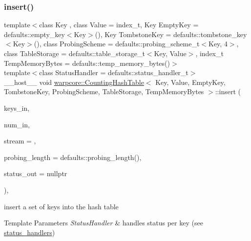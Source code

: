 \subsubsection{\texorpdfstring{insert()}{insert()}\hspace{0.1cm}{\footnotesize\ttfamily [2/2]}}
{\footnotesize\ttfamily template$<$class Key , class Value  = index\+\_\+t, Key Empty\+Key = defaults\+::empty\+\_\+key$<$\+Key$>$(), Key Tombstone\+Key = defaults\+::tombstone\+\_\+key$<$\+Key$>$(), class Probing\+Scheme  = defaults\+::probing\+\_\+scheme\+\_\+t$<$\+Key, 4$>$, class Table\+Storage  = defaults\+::table\+\_\+storage\+\_\+t$<$\+Key, Value$>$, index\+\_\+t Temp\+Memory\+Bytes = defaults\+::temp\+\_\+memory\+\_\+bytes()$>$ \\
template$<$class Status\+Handler  = defaults\+::status\+\_\+handler\+\_\+t$>$ \\
\+\_\+\+\_\+host\+\_\+\+\_\+ void \hyperlink{classwarpcore_1_1CountingHashTable}{warpcore\+::\+Counting\+Hash\+Table}$<$ Key, Value, Empty\+Key, Tombstone\+Key, Probing\+Scheme, Table\+Storage, Temp\+Memory\+Bytes $>$\+::insert (\begin{DoxyParamCaption}\item[{key\+\_\+type $\ast$}]{keys\+\_\+in,  }\item[{index\+\_\+type}]{num\+\_\+in,  }\item[{cuda\+Stream\+\_\+t}]{stream = {},  }\item[{index\+\_\+type}]{probing\+\_\+length = {\ttfamily defaults\+:\+:probing\+\_\+length()},  }\item[{typename Status\+Handler\+::base\+\_\+type $\ast$}]{status\+\_\+out = {\ttfamily nullptr} }\end{DoxyParamCaption})\hspace{0.3cm}{\ttfamily [inline]}, {\ttfamily [noexcept]}}



insert a set of keys into the hash table 


\begin{DoxyTemplParams}{Template Parameters}
{\em Status\+Handler} & handles status per key (see {\ttfamily \hyperlink{namespacewarpcore_1_1status__handlers}{status\+\_\+handlers}}) \\
\hline
\end{DoxyTemplParams}

